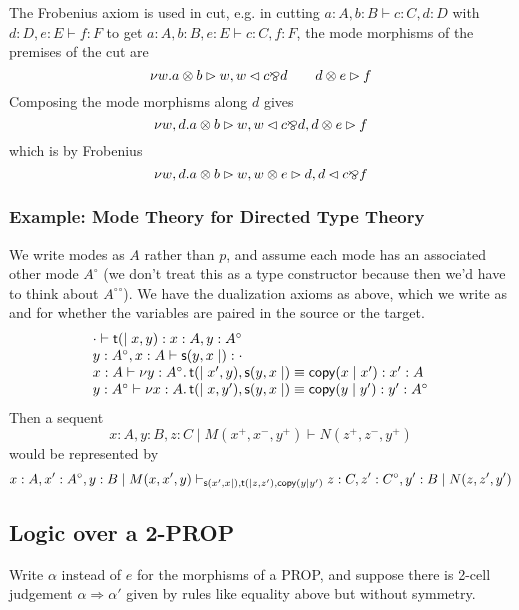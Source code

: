 \documentclass{article}
\newcommand\deq{\ensuremath{\equiv}}
\newcommand\spr{\ensuremath{\Rightarrow}} %
\begin{document}
The Frobenius axiom is used in cut, e.g. in cutting $a:A,b:B \vdash
c:C,d:D$ with $d:D,e:E \vdash f:F$ to get $a:A,b:B,e:E \vdash c:C,f:F$,
the mode morphisms of the premises of the cut are
\[
\nu w. a \otimes b \rhd w, w \lhd c \bindnasrepma d  \qquad d \otimes e \rhd f
\]
Composing the mode morphisms along $d$ gives
\[
\nu w,d. a \otimes b \rhd w, w \lhd c \bindnasrepma d, d \otimes e \rhd f
\]
which is by Frobenius
\[
\nu w,d. a \otimes b \rhd w, w \otimes e \rhd d, d \lhd c \bindnasrepma f
\]

\subsubsection{Example: Mode Theory for Directed Type Theory}

\newcommand{\dualm}[1]{\ensuremath{#1^{\mathord{\circ}}}}

We write modes as $A$ rather than $p$, and assume each mode has an
associated other mode $\dualm A$ (we don't treat this as a type
constructor because then we'd have to think about $\dualm {{\dualm A}}$).
We have the dualization axioms as above, which we write as  and
 for whether the variables are paired in the source or the
target.  
\[
\begin{array}{l}
\tseq{\cdot}{\const{t}{}{x,y}}{x:A,y:\dualm A}\\
\tseq{y:\dualm A,x:A}{\const{s}{y,x}{}}{\cdot}\\
\tseq{x:A}{\cut{y:\dualm A}{\const{t}{}{x',y},{\const{s}{y,x}{}} \deq \cpy{x}{x'} }}{x':A} \\
\tseq{y:\dualm A}{\cut{x:A}{\const{t}{}{x,y'},{\const{s}{y,x}{}} \deq \cpy{y}{y'} }}{y':\dualm A} \\
\end{array}
\]
Then a sequent 
\[
x:A,y:B,z:C \mid M(x^+,x^-,y^+) \vdash N(z^+,z^-,y^+)
\]
would be represented by 
\[
x:A, x':\dualm{A}, y:B \mid M(x,x',y) \vdash_{\const{s}{x',x}{},\const{t}{}{z,z'},\cpy{y}{y'}} z:C, z':\dualm{C}, y':B \mid N(z,z',y')
\]

\subsection{Logic over a 2-PROP}

\newcommand{\seqh}[5]{\ensuremath{#1 \mid #2 \vdash_{#3} #4 \mid #5}}
\newcommand{\ct}[2]{\ensuremath{#1 \mid #2}}

Write $\alpha$ instead of $e$ for the morphisms of a PROP, and suppose
there is 2-cell judgement $\alpha \spr \alpha'$ given by rules like
equality above but without symmetry.
\end{document}
